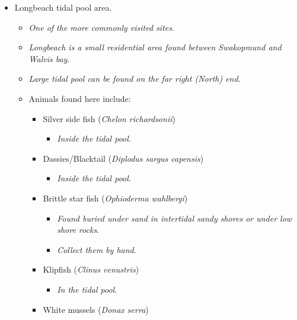 \documentclass[
  letterpaper,
  DIV=11,
  numbers=noendperiod]{scrreprt}
\providecommand{\tightlist}{%
  \setlength{\itemsep}{0pt}\setlength{\parskip}{0pt}}\usepackage{longtable,booktabs,array}
\begin{document}
\begin{itemize}
\tightlist
\item
  Longbeach tidal pool area.

  \begin{itemize}
  \tightlist
  \item
    \emph{One of the more commonly visited sites}.
  \item
    \emph{Longbeach is a small residential area found between Swakopmund
    and Walvis bay}.
  \item
    \emph{Large tidal pool can be found on the far right (North) end}.
  \item
    Animals found here include:

    \begin{itemize}
    \tightlist
    \item
      Silver side fish (\emph{Chelon richardsonii})

      \begin{itemize}
      \tightlist
      \item
        \emph{Inside the tidal pool}.
      \end{itemize}
    \item
      Dassies/Blacktail (\emph{Diplodus sargus capensis})

      \begin{itemize}
      \tightlist
      \item
        \emph{Inside the tidal pool}.
      \end{itemize}
    \item
      Brittle star fish (\emph{Ophioderma wahlbergi})

      \begin{itemize}
      \tightlist
      \item
        \emph{Found buried under sand in intertidal sandy shores or
        under low shore rocks}.
      \item
        \emph{Collect them by hand}.
      \end{itemize}
    \item
      Klipfish (\emph{Clinus venustris})

      \begin{itemize}
      \tightlist
      \item
        \emph{In the tidal pool}.
      \end{itemize}
    \item
      White mussels (\emph{Donax serra})


\end{itemize}
\end{itemize}
\end{itemize}
\end{document}

